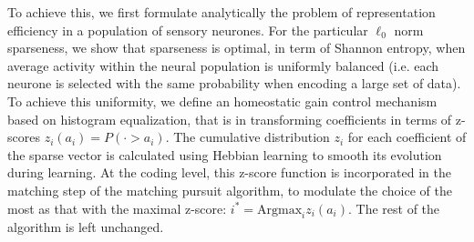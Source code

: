 \documentclass[a4paper, 11pt, draft]{article} %
\begin{document}
To achieve this, we first formulate analytically the problem of representation efficiency in a population of sensory neurones. For the particular $\ell_0$ norm sparseness, we show that sparseness is optimal, in term of Shannon entropy, when average activity within the neural population is uniformly balanced (i.e. each neurone is selected with the same probability when encoding a large set of data). To achieve this uniformity, we define an homeostatic gain control mechanism based on histogram equalization, that is in transforming coefficients in terms of z-scores $z_i(a_i) = P( \cdot > a_i)$. The cumulative distribution $z_i$ for each coefficient of the sparse vector is calculated using Hebbian learning to smooth its evolution during learning. At the coding level, this z-score function is incorporated in the matching step of the matching pursuit algorithm, to modulate the choice of the most as that with the maximal z-score: $i^\ast = \mathrm{Argmax}_i z_i(a_i)$. The rest of the algorithm is left unchanged.
\end{document}
